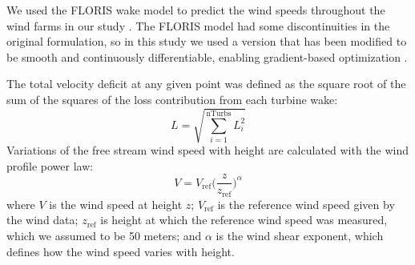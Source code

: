 We used the FLORIS wake model to predict the wind speeds throughout the wind farms in our study \citep{gebraad2016wind}. 
The FLORIS model had some discontinuities in the original formulation, so in this study we used a version that has been modified to be smooth and continuously differentiable, enabling gradient-based optimization \citep{thomas2017improving}.

The total velocity deficit at any given point was defined as the square root of the sum of the squares of the loss contribution from each turbine wake:
\begin{equation}
L = \sqrt{\sum_{i=1}^\text{nTurbs}L_i^2}
\end{equation}
\noindent Variations of the free stream wind speed with height are calculated with the wind profile power law: 
\begin{equation}
V = V_{\text{ref}}\Big(\frac{z}{z_{\text{ref}}}\Big)^\alpha
\label{Eq:shear}
\end{equation}
where $V$ is the wind speed at height $z$; $V_{\text{ref}}$ is the reference wind speed given by the wind data; $z_{\text{ref}}$ is height at which the reference wind speed was measured, which we assumed to be 50 meters;  and $\alpha$ is the wind shear exponent, which defines how the wind speed varies with height.